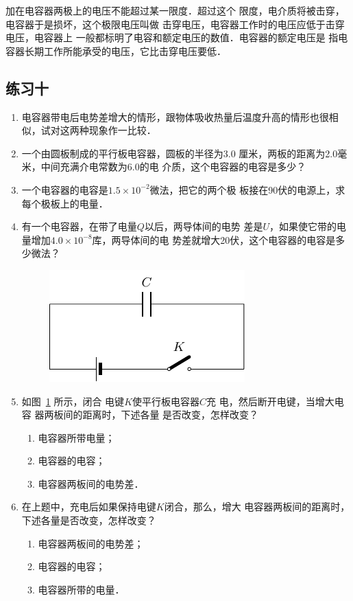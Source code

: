 加在电容器两极上的电压不能超过某一限度．超过这个
限度，电介质将被击穿，电容器于是损坏，这个极限电压叫做
击穿电压，电容器工作时的电压应低于击穿电压，电容器上
一般都标明了电容和额定电压的数值．电容器的额定电压是
指电容器长期工作所能承受的电压，它比击穿电压要低．

\subsection*{练习十}
\begin{enumerate}
    \item 电容器带电后电势差增大的情形，跟物体吸收热量后温度升高的情形也很相似，试对这两种现象作一比较．
    \item 一个由圆板制成的平行板电容器，圆板的半径为3.0
厘米，两板的距离为2.0毫米，中间充满介电常数为6.0的电
介质，这个电容器的电容是多少？
\item 一个电容器的电容是$1.5\times10^{-2}$微法，把它的两个极
板接在90伏的电源上，求每个极板上的电量．
\item 有一个电容器，在带了电量$Q$以后，两导体间的电势
差是$U$，如果使它带的电量增加$4.0\times10^{-8}$库，两导体间的电
势差就增大20伏，这个电容器的电容是多少微法？

\begin{figure}[htbp]
    \centering
    \includegraphics{fig/B/6-39.pdf}
    \caption{}\label{fig_B_6-39}
\end{figure}

\item 如图~\ref{fig_B_6-39} 所示，闭合
电键$K$使平行板电容器$C$充
电，然后断开电键，当增大电容
器两板间的距离时，下述各量
是否改变，怎样改变？
\begin{enumerate}
    \item 电容器所带电量；
    \item 电容器的电容；
    \item 电容器两板间的电势差．
\end{enumerate}
\item 在上题中，充电后如果保持电键$K$闭合，那么，增大
电容器两板间的距离时，下述各量是否改变，怎样改变？
\begin{enumerate}
    \item 电容器两板间的电势差；
    \item 电容器的电容；
    \item 电容器所带的电量．
\end{enumerate}
\end{enumerate}

